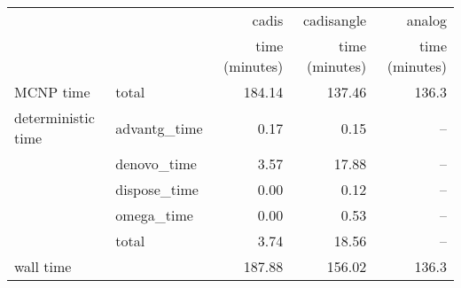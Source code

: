 \begin{tabular}{llrrr}
\toprule
          &              &          cadis &     cadisangle &         analog \\
          &              & time (minutes) & time (minutes) & time (minutes) \\
\midrule
MCNP time & total &         184.14 &         137.46 &          136.3 \\
deterministic time & advantg\_time &           0.17 &           0.15 &            -- \\
          & denovo\_time &           3.57 &          17.88 &            -- \\
          & dispose\_time &           0.00 &           0.12 &            -- \\
          & omega\_time &           0.00 &           0.53 &            -- \\
          & total &           3.74 &          18.56 &            -- \\
wall time &              &         187.88 &         156.02 &          136.3 \\
\bottomrule
\end{tabular}
